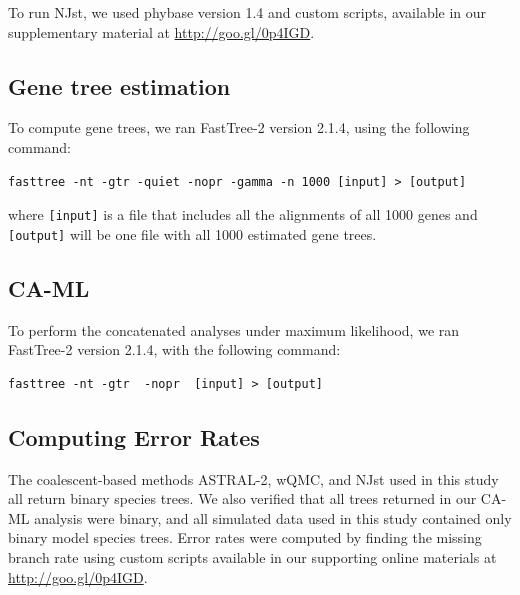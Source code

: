 To run NJst, we used phybase version 1.4 \cite{liu2010phybase}
and custom scripts, available in our supplementary material at \url{http://goo.gl/0p4IGD}. 


\subsection{Gene tree estimation}
To compute gene trees, we ran FastTree-2  version 2.1.4, using the following command:
\begin{verbatim}
fasttree -nt -gtr -quiet -nopr -gamma -n 1000 [input] > [output]
\end{verbatim}
where {\tt [input]} is a file that includes all the alignments of all 1000 genes and 
{\tt [output]} will be one file with all 1000 estimated gene trees. 

\subsection{CA-ML}
To perform the concatenated  analyses under maximum likelihood,
we ran FastTree-2 version 2.1.4, with the following
command:
\begin{verbatim}
fasttree -nt -gtr  -nopr  [input] > [output]
\end{verbatim}


\subsection{Computing Error Rates}
The coalescent-based methods ASTRAL-2, wQMC, and NJst used in this study all return binary species trees.   We also verified that all trees returned in our CA-ML analysis were binary, and all simulated data used in this study contained only binary model species trees.  
Error rates were computed by finding the missing branch rate using custom scripts available in our supporting online materials at \url{http://goo.gl/0p4IGD}.  



